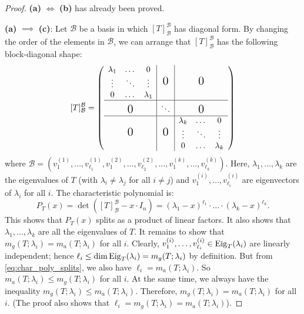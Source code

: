 \begin{proof}
  \textbf{(a)} $\iff$ \textbf{(b)} has already been proved.

  \textbf{(a)} $\implies$ \textbf{(c)}: Let $\mathcal{B}$ be a basis in which $[T]_{\mathcal{B}}^{\mathcal{B}}$ has diagonal form. By changing the order of the elements in $\mathcal{B}$, we can arrange that $[T]_{\mathcal{B}}^{\mathcal{B}}$ has the following block-diagonal shape:
  \begin{equation} \label{eq:ordered_diag_matrix}
    [T]_{\mathcal{B}}^{\mathcal{B}} = \left( \begin{array}{c|c|c}
      \begin{matrix} \lambda_1 & \dots & 0 \\ \vdots & \ddots & \vdots \\ 0 & \dots & \lambda_1 \end{matrix} & \text{\Large 0} & \text{\Large 0} \\
      \hline
      \text{\Large 0} & \ddots & \text{\Large 0} \\
      \hline
      \text{\Large 0} & \text{\Large 0} & \begin{matrix} \lambda_k & \dots & 0 \\ \vdots & \ddots & \vdots \\ 0 & \dots & \lambda_k \end{matrix}
    \end{array} \right)
  \end{equation}
  where $\mathcal{B} = (v_1^{(1)}, \dots, v_{\ell_1}^{(1)}, v_1^{(2)}, \dots, v_{\ell_2}^{(2)}, \dots, v_1^{(k)}, \dots, v_{\ell_k}^{(k)})$.
  Here, $\lambda_1, \dots, \lambda_k$ are the eigenvalues of $T$ (with $\lambda_i \ne \lambda_j$ for all $i \ne j$) and $v_1^{(i)}, \dots, v_{\ell_i}^{(i)}$ are eigenvectors of $\lambda_i$ for all $i$. The characteristic polynomial is:
  \begin{equation} \label{eq:char_poly_splits}
    P_T(x) = \det([T]_{\mathcal{B}}^{\mathcal{B}} - x \cdot I_n) = (\lambda_1 - x)^{\ell_1} \cdot \dots \cdot (\lambda_k - x)^{\ell_k}.
  \end{equation}
  This shows that $P_T(x)$ splits as a product of linear factors. It also shows that $\lambda_1, \dots, \lambda_k$ are all the eigenvalues of $T$. It remains to show that $m_g(T; \lambda_i) = m_a(T; \lambda_i)$ for all $i$.
  Clearly, $v_1^{(i)}, \dots, v_{\ell_i}^{(i)} \in \operatorname{Eig}_T(\lambda_i)$ are linearly independent; hence $\ell_i \le \dim \operatorname{Eig}_T(\lambda_i) = m_g(T; \lambda_i)$ by definition.
  But from \eqref{eq:char_poly_splits}, we also have $\ell_i = m_a(T; \lambda_i)$.
  So $m_a(T; \lambda_i) \le m_g(T; \lambda_i)$ for all $i$. At the same time, we always have the inequality $m_g(T; \lambda_i) \le m_a(T; \lambda_i)$.
  Therefore, $m_g(T; \lambda_i) = m_a(T; \lambda_i)$ for all $i$. (The proof also shows that $\ell_i = m_g(T; \lambda_i) = m_a(T; \lambda_i)$).


\end{proof}
